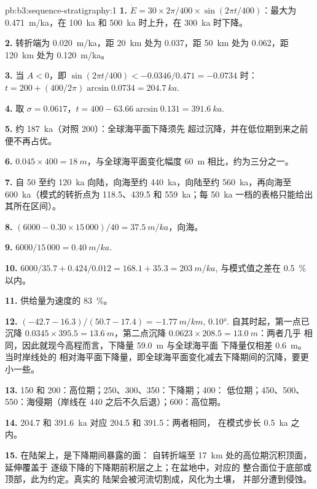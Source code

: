 \begin{solution}{pb:b3:sequence-stratigraphy:1}
\textbf{1.} $\dot E = 30\times2\pi/400\times\sin(2\pi t/400)$：最大为
\qty{0.471}{m/ka}，在 \qty{100}{ka} 和 \qty{500}{ka} 时上升，在
\qty{300}{ka} 时下降。

\textbf{2.} 转折端为 \qty{0.020}{m/ka}，距 \qty{20}{km} 处为 0.037，距
\qty{50}{km} 处为 0.062，距 \qty{120}{km} 处为 \qty{0.120}{m/ka}。

\textbf{3.} 当 $A < 0$，即 $\sin(2\pi t/400) < -0.0346/0.471 = -0.0734$ 时：$t =
200 + (400/2\pi)\arcsin0.0734 = \qty{204.7}{ka}$.

\textbf{4.} 取 $\sigma = 0.0617$，$t = 400 - 63.66\arcsin0.131 =
\qty{391.6}{ka}$.

\textbf{5.} 约 \qty{187}{ka}（对照 200）：全球海平面下降须先
超过沉降，并在低位期到来之前便不再占优。

\textbf{6.} $0.045\times400 = \qty{18}{m}$，与全球海平面变化幅度
\qty{60}{m} 相比，约为三分之一。

\textbf{7.} 自 50 至约 \qty{120}{ka} 向陆，向海至约
\qty{440}{ka}，向陆至约 \qty{560}{ka}，再向海至
\qty{600}{ka}（模式的转折点为 118.5、439.5 和
\qty{559}{ka}；每 \qty{50}{ka} 一档的表格只能给出其所在区间）。

\textbf{8.} $(6000 - 0.30\times15\,000)/40 = \qty{37.5}{m/ka}$，向海。

\textbf{9.} $6000/15\,000 = \qty{0.40}{m/ka}$.

\textbf{10.} $6000/35.7 + 0.424/0.012 = 168.1 + 35.3 = \qty{203}{m/ka}$,
与模式值之差在 \qty{0.5}{\percent} 以内。

\textbf{11.} 供给量为速度的 \qty{83}{\percent}。

\textbf{12.} $(-42.7 - 16.3)/(50.7 - 17.4) = \qty{-1.77}{m/km}$, \ang{0.10}.
自其时起，第一点已沉降 $0.0345\times395.5 =
\qty{13.6}{m}$，第二点沉降 $0.0623\times208.5 = \qty{13.0}{m}$：两者几乎
相同，因此就现今高程而言，下降量 \qty{59.0}{m} 与全球海平面
下降量仅相差 \qty{0.6}{m}。当时岸线处的
相对海平面下降量，即全球海平面变化减去下降期间的沉降，要更小一些。

\textbf{13.} 150 和 200：高位期；250、300、350：下降期；400：
低位期；450、500、550：海侵期（岸线在
440 之后不久后退）；600：高位期。

\textbf{14.} 204.7 和 \qty{391.6}{ka} 对应 204.5 和 391.5：两者相同，
在模式步长 \qty{0.5}{ka} 之内。

\textbf{15.} 在陆架上，是下降期间暴露的面：
自转折端至 \qty{17}{km} 处的高位期沉积顶面，延伸覆盖于
逐级下降的下降期前积层之上；在盆地中，对应的
整合面位于底部或顶部，此为约定。真实的
陆架会被河流切割成，风化为土壤，
并部分遭到侵蚀。


\end{solution}

